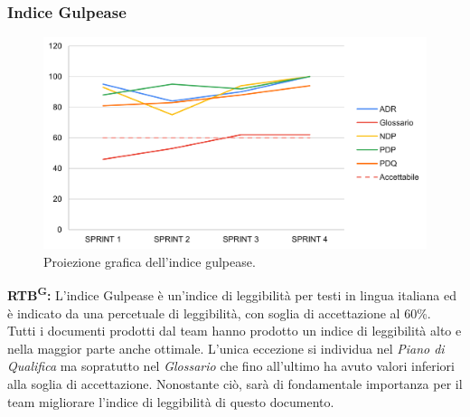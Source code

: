 \documentclass[8pt]{article}
\newcommand{\glossterm}[1]{#1\textsuperscript{G}} %
\begin{document}
\subsubsection{Indice Gulpease}
\begin{figure}[h!]
    \centering
    \includegraphics[width=1\textwidth]{images/IG.png}
    \caption{Proiezione grafica dell'indice gulpease.}
    \label{fig:Proiezione grafica dell'indice gulpease}
\end{figure}
\textbf{\glossterm{RTB}:} L'indice Gulpease è un'indice di leggibilità per testi in lingua italiana ed è indicato da una percetuale di leggibilità, con soglia di accettazione al 60\%. Tutti i documenti prodotti dal team hanno prodotto un indice di leggibilità alto e nella maggior parte anche ottimale. L'unica eccezione si individua nel \textit{Piano di Qualifica} ma sopratutto nel \textit{Glossario} che fino all'ultimo ha avuto valori inferiori alla soglia di accettazione. Nonostante ciò, sarà di fondamentale importanza per il team migliorare l'indice di leggibilità di questo documento.
\clearpage
\end{document}
